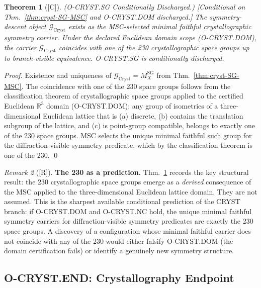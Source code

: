 \documentclass[12pt,oneside]{amsbook}
\theoremstyle{plain}
\newtheorem{theorem}{Theorem}[section]
\theoremstyle{definition}
\theoremstyle{remark}
\newtheorem{remark}[theorem]{Remark}
\newcommand{\status}[1]{\textup{[#1]}}
\begin{document}
\begin{theorem}[\status{C}]\label{thm:cryst-SG-discharged}
\textup{(O-CRYST.SG Conditionally Discharged.)}
\textup{[Conditional on Thm.~\ref{thm:cryst-SG-MSC} and
O-CRYST.DOM discharged.]}
The symmetry-descent object $\mathcal{G}_{\mathrm{Cryst}}$ exists
as the MSC-selected minimal faithful crystallographic symmetry
carrier.  Under the declared Euclidean domain scope (O-CRYST.DOM),
the carrier $\mathcal{G}_{\mathrm{Cryst}}$ coincides with one of
the 230 crystallographic space groups up to branch-visible
equivalence.  O-CRYST.SG is conditionally discharged.
\end{theorem}

\begin{proof}
Existence and uniqueness of $\mathcal{G}_{\mathrm{Cryst}} =
M^{\mathrm{SG}}_X$ from Thm.~\ref{thm:cryst-SG-MSC}.  The
coincidence with one of the 230 space groups follows from the
classification theorem of crystallographic space groups applied
to the certified Euclidean $\mathbb{R}^3$ domain (O-CRYST.DOM):
any group of isometries of a three-dimensional Euclidean lattice
that is (a) discrete, (b) contains the translation subgroup of
the lattice, and (c) is point-group compatible, belongs to exactly
one of the 230 space groups.  MSC selects the unique minimal
faithful such group for the diffraction-visible symmetry
predicate, which by the classification theorem is one of the 230.
\qed
\end{proof}

\begin{remark}[\status{R}]\label{rem:cryst-230-derived}
\textbf{The 230 as a prediction.}
Thm.~\ref{thm:cryst-SG-discharged} records the key structural
result: the 230 crystallographic space groups emerge as a
\emph{derived} consequence of the MSC applied to the
three-dimensional Euclidean lattice domain.  They are not assumed.
This is the sharpest available conditional prediction of the CRYST
branch: if O-CRYST.DOM and O-CRYST.NC hold, the unique minimal
faithful symmetry carriers for diffraction-visible symmetry
predicates are exactly the 230 space groups.  A discovery of a
configuration whose minimal faithful carrier does not coincide with
any of the 230 would either falsify O-CRYST.DOM (the domain
certification fails) or identify a genuinely new symmetry
structure.
\end{remark}

\subsection{O-CRYST.END: Crystallography Endpoint}
\label{sec:cryst-END-discharge}
\end{document}
